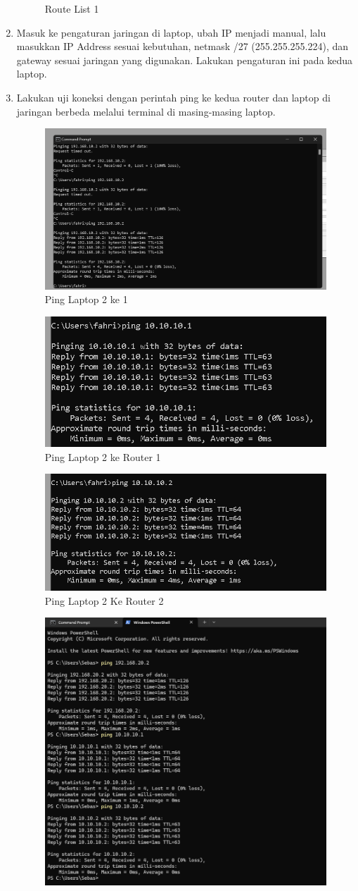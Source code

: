 \begin{enumerate}
\begin{figure}[H]
        \caption{Route List 1}
        \label{fig:enter-label}
    \end{figure}
    \item Masuk ke pengaturan jaringan di laptop, ubah IP menjadi manual, lalu masukkan IP Address sesuai kebutuhan, netmask /27 (255.255.255.224), dan gateway sesuai jaringan yang digunakan. Lakukan pengaturan ini pada kedua laptop.
    \item Lakukan uji koneksi dengan perintah ping ke kedua router dan laptop di jaringan berbeda melalui terminal di masing-masing laptop.
    \begin{figure}[H]
        \centering
        \includegraphics[width=0.5\linewidth]{ping laptop 2 ke laptop 1.png}
        \caption{Ping Laptop 2 ke 1}
        \label{fig:enter-label}
    \end{figure}
    \begin{figure}[H]
        \centering
        \includegraphics[width=0.5\linewidth]{ping laptop 2 ke router 1.png}
        \caption{Ping Laptop 2 ke Router 1}
        \label{fig:enter-label}
    \end{figure}
    \begin{figure}[H]
        \centering
        \includegraphics[width=0.5\linewidth]{ping laptop 2 ke royter 2.png}
        \caption{Ping Laptop 2 Ke Router 2}
        \label{fig:enter-label}
    \end{figure}
    \begin{figure}[H]
        \centering
        \includegraphics[width=0.5\linewidth]{static.png}

\end{figure}
\end{enumerate}

